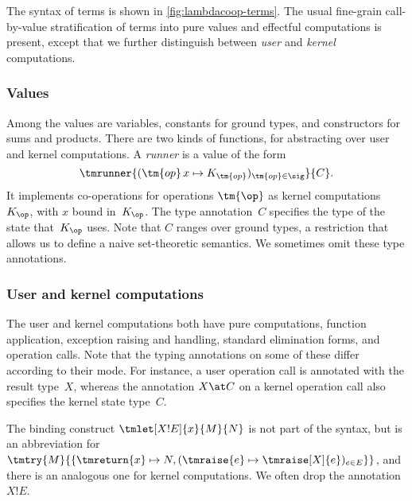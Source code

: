 The syntax of terms is shown in \cref{fig:lambdacoop-terms}. The
usual fine-grain call-by-value stratification of terms into pure values and effectful
computations is present, except that we further distinguish between \emph{user} and
\emph{kernel} computations.

\subsubsection{Values}
\label{sec:values}

Among the values are variables, constants for ground types, and constructors 
for sums and products. There are two kinds of functions, for abstracting over user and
kernel computations. A \emph{runner} is a value of the form
%
\begin{equation*}
  \tmrunner{(\tm{op}\,x \mapsto K_{\tm{op}})_{\tm{op} \in \sig}}{C}.
\end{equation*}
%
It implements co-operations for operations $\tm{\op}$ as kernel
computations~$K_\op$, with $x$ bound in~$K_\op$. The type annotation~$C$
specifies the type of the state that~$K_\op$ uses.
Note that $C$ ranges over ground types, a restriction that allows us to define a naive
set-theoretic semantics.
%
We sometimes omit these type annotations.

\subsubsection{User and kernel computations}

The user and kernel computations both have pure computations, function application,
exception raising and handling, standard elimination forms, and operation calls.
Note that the typing annotations on some of these differ according to their mode.
For instance, a user operation call is annotated
with the result type~$X$, whereas the annotation $X \at C$ on a kernel operation call
also specifies the kernel state type~$C$.

The binding construct $\tmlet[X ! E]{x}{M}{N}$ is not part of the syntax,
but is an abbreviation for
%
$
  \tmtry{M}{
  \{ \tmreturn{x} \mapsto N,
     (\tmraise{e} \mapsto \tmraise[X]{e})_{e \in E}
   \}}
$,
%
and there is an analogous one for kernel computations. We often drop the 
annotation $X ! E$.

